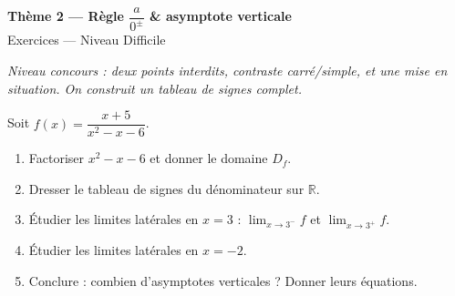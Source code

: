 \documentclass[11pt,a4paper]{article}
\newcommand{\R}{\mathbb{R}}
\begin{document}
\begin{center}
{\Large\bfseries\color{primarydark}Thème 2 — Règle $\dfrac{a}{0^{\pm}}$ \& asymptote verticale}\\[2pt]
{\large\color{primary}Exercices — Niveau Difficile}
\end{center}
\vspace{4pt}
{\small\itshape Niveau concours : deux points interdits, contraste carré/simple, et une mise en
situation. On construit un tableau de signes complet.}
\vspace{6pt}

\begin{exercice}
Soit $f(x)=\dfrac{x+5}{x^2-x-6}$.
\begin{enumerate}[label=\alph*),leftmargin=2em,itemsep=3pt]
  \item Factoriser $x^2-x-6$ et donner le domaine $D_f$.
  \item Dresser le tableau de signes du dénominateur sur $\R$.
  \item Étudier les limites latérales en $x=3$ : $\displaystyle\lim_{x\to 3^{-}} f$ et $\displaystyle\lim_{x\to 3^{+}} f$.
  \item Étudier les limites latérales en $x=-2$.
  \item Conclure : combien d'asymptotes verticales ? Donner leurs équations.
\end{enumerate}
\end{exercice}
\end{document}
